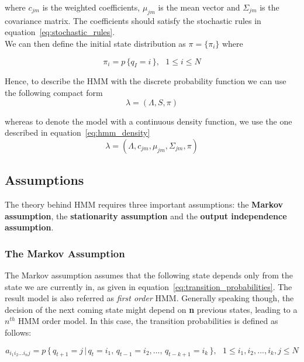 \noindent where $c_{jm}$ is the weighted coefficients, $\mu_{jm}$ is the mean vector and $\Sigma_{jm}$ is the covariance matrix. The coefficients should satisfy the stochastic rules in equation~\ref{eq:stochastic_rules}. \\
\noindent We can then define the initial state distribution as $\pi = \{\pi_{i}\}$ where

\begin{equation}
	\pi_{i} = p \, \{ q_{I} = i \, \}, \,\,\,\, 1 \leq i \leq N
\end{equation}

\noindent Hence, to describe the HMM with the discrete probability function we can use the following compact form
\begin{equation}
\label{eq:hmm_discrete}
	\lambda = (\Lambda, S, \pi )
\end{equation}

\noindent whereas to denote the model with a continuous density function, we use the one described in equation~\ref{eq:hmm_density}
\begin{equation}
\label{eq:hmm_density}
\lambda = (\Lambda, c_{jm}, \mu_{jm}, \Sigma_{jm}, \pi )
\end{equation}

\subsection{Assumptions}
\label{sub:assumptions_hmm}
The theory behind HMM requires three important assumptions: the \textbf{Markov assumption}, the \textbf{stationarity assumption} and the \textbf{output independence assumption}.

\subsubsection{The Markov Assumption}
The Markov assumption assumes that the following state depends only from the state we are currently in, as given in equation~\ref{eq:transition_probabilities}. The result model is also referred as \textit{first order} HMM. Generally speaking though, the decision of the next coming state might depend on \textbf{n} previous states, leading to a $n^{th}$ HMM order model. In this case, the transition probabilities is defined as follows:

\begin{equation}
\label{eq:transition_nth_order}
a_{i_{1}i_{2}...i_{n}j} = p\, \{\, q_{t+1} = j \,|\, q_{t} = i_{1}, \, q_{t-1} = i_{2}, ... , \, q_{t-k+1} = i_{k} \, \}, \,\,\,\, 1 \leq i_{1},i_{2}, ... ,i_{k}, j \leq N
\end{equation}


